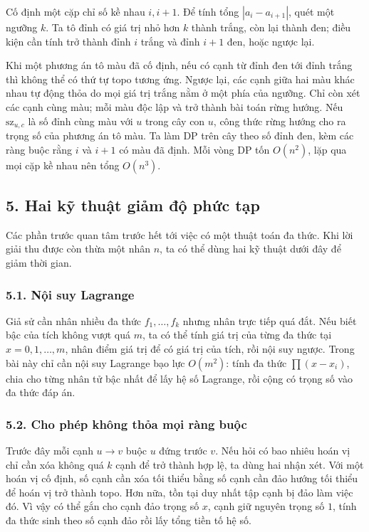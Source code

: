 \documentclass[11pt]{article}
\begin{document}
Cố định một cặp chỉ số kề nhau \(i,i+1\). Để tính tổng
\(|a_i-a_{i+1}|\), quét một ngưỡng \(k\). Ta tô đỉnh có giá trị nhỏ hơn \(k\)
thành trắng, còn lại thành đen; điều kiện cần tính trở thành đỉnh \(i\) trắng
và đỉnh \(i+1\) đen, hoặc ngược lại.

Khi một phương án tô màu đã cố định, nếu có cạnh từ đỉnh đen tới đỉnh trắng thì
không thể có thứ tự topo tương ứng. Ngược lại, các cạnh giữa hai màu khác nhau
tự động thỏa do mọi giá trị trắng nằm ở một phía của ngưỡng. Chỉ còn xét các
cạnh cùng màu; mỗi màu độc lập và trở thành bài toán rừng hướng. Nếu
\(\mathrm{sz}_{u,c}\) là số đỉnh cùng màu với \(u\) trong cây con \(u\), công
thức rừng hướng cho ra trọng số của phương án tô màu. Ta làm DP trên cây theo
số đỉnh đen, kèm các ràng buộc rằng \(i\) và \(i+1\) có màu đã định. Mỗi vòng
DP tốn \(O(n^2)\), lặp qua mọi cặp kề nhau nên tổng \(O(n^3)\).

\subsection*{5. Hai kỹ thuật giảm độ phức tạp}

Các phần trước quan tâm trước hết tới việc có một thuật toán đa thức. Khi lời
giải thu được còn thừa một nhân \(n\), ta có thể dùng hai kỹ thuật dưới đây để
giảm thời gian.

\subsubsection*{5.1. Nội suy Lagrange}

Giả sử cần nhân nhiều đa thức \(f_1,\ldots,f_k\) nhưng nhân trực tiếp quá đắt.
Nếu biết bậc của tích không vượt quá \(m\), ta có thể tính giá trị của từng
đa thức tại \(x=0,1,\ldots,m\), nhân điểm giá trị để có giá trị của tích, rồi
nội suy ngược. Trong bài này chỉ cần nội suy Lagrange bạo lực \(O(m^2)\): tính
đa thức \(\prod(x-x_i)\), chia cho từng nhân tử bậc nhất để lấy hệ số Lagrange,
rồi cộng có trọng số vào đa thức đáp án.

\subsubsection*{5.2. Cho phép không thỏa mọi ràng buộc}

Trước đây mỗi cạnh \(u\to v\) buộc \(u\) đứng trước \(v\). Nếu hỏi có bao nhiêu
hoán vị chỉ cần xóa không quá \(k\) cạnh để trở thành hợp lệ, ta dùng hai nhận
xét. Với một hoán vị cố định, số cạnh cần xóa tối thiểu bằng số cạnh cần đảo
hướng tối thiểu để hoán vị trở thành topo. Hơn nữa, tồn tại duy nhất tập cạnh
bị đảo làm việc đó. Vì vậy có thể gắn cho cạnh đảo trọng số \(x\), cạnh giữ
nguyên trọng số \(1\), tính đa thức sinh theo số cạnh đảo rồi lấy tổng tiền tố
hệ số.
\end{document}

